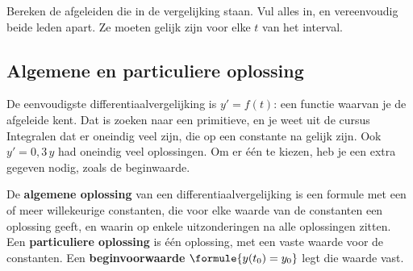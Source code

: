 
\begin{werkwijze}
Bereken de afgeleiden die in de vergelijking staan. Vul alles in, en vereenvoudig beide leden apart. Ze moeten gelijk zijn voor elke $t$ van het interval.
\end{werkwijze}


\begin{oefeningen}
\end{oefeningen}

\subsection{Algemene en particuliere oplossing}

De eenvoudigste differentiaalvergelijking is $y' = f(t)$: een functie waarvan je de afgeleide kent. Dat is zoeken naar een primitieve, en je weet uit de cursus Integralen dat er oneindig veel zijn, die op een constante na gelijk zijn. Ook $y' = 0{,}3\,y$ had oneindig veel oplossingen. Om er één te kiezen, heb je een extra gegeven nodig, zoals de beginwaarde.

\begin{theorie}
De \textbf{\textcolor{accent}{algemene oplossing}} van een differentiaalvergelijking is een formule met een of meer willekeurige constanten, die voor elke waarde van de constanten een oplossing geeft, en waarin op enkele uitzonderingen na alle oplossingen zitten. Een \textbf{\textcolor{accent}{particuliere oplossing}} is één oplossing, met een vaste waarde voor de constanten. Een \textbf{\textcolor{accent}{beginvoorwaarde}} $\formule{y(t_0) = y_0}$ legt die waarde vast.
\end{theorie}

